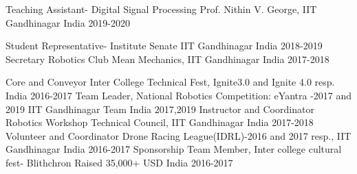 

\begin{cvhonors}
  \cvhonor
    {Teaching Assistant- Digital Signal Processing} %
    {Prof. Nithin V. George, IIT Gandhinagar} %
    {India} %
    {2019-2020} %

  \cvhonor
    {Student Representative- Institute Senate} %
    {IIT Gandhinagar} %
    {India} %
    {2018-2019} %
  \cvhonor
    {Secretary Robotics Club} %
    {Mean Mechanics, IIT Gandhinagar  } %
    {India} %
    {2017-2018} %

  \cvhonor
    {Core and Conveyor} %
    {Inter College Technical Fest, Ignite3.0 and Ignite 4.0 resp.} %
    {India} %
    {2016-2017} %
    \cvhonor
    {Team Leader, National Robotics Competition: eYantra -2017 and 2019} %
    {IIT Gandhinagar Team}%
    {India} %
    {2017,2019} %
  \cvhonor
    {Instructor and Coordinator Robotics Workshop} %
    {Technical Council, IIT Gandhinagar } %
    {India} %
    {2017-2018} %
  \cvhonor
    {Volunteer and Coordinator} %
    {Drone Racing League(IDRL)-2016 and 2017 resp., IIT Gandhinagar} %
    {India} %
    {2016-2017} %
\cvhonor
    {Sponsorship Team Member, Inter college cultural fest- Blithchron} %
    {Raised 35,000+ USD} %
    {India} %
    {2016-2017} %
\end{cvhonors}

